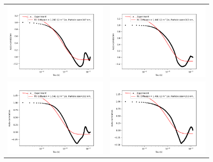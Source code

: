 \begin{figure}[H]
  \noindent
  \centering
  \begin{longtable}{p{7cm}p{7cm}}
    \includegraphics[width=8cm]{Images/AutoCor_Hijau_Data10-01.png}
    &
    \includegraphics[width=8cm]{Images/AutoCor_Merah_Data9-01.png} \\
    
    \includegraphics[width=8cm]{Images/AutoCor_Hijau_Data100-01.png}
    &
    \includegraphics[width=8cm]{Images/AutoCor_Merah_Data99-01.png} \\
   
  \end{longtable}
\end{figure}

